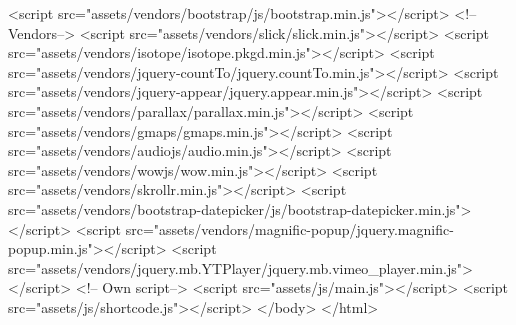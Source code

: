   <script src="assets/vendors/bootstrap/js/bootstrap.min.js"></script> 
  <!-- Vendors--> 
  <script src="assets/vendors/slick/slick.min.js"></script> 
  <script src="assets/vendors/isotope/isotope.pkgd.min.js"></script> 
  <script src="assets/vendors/jquery-countTo/jquery.countTo.min.js"></script> 
  <script src="assets/vendors/jquery-appear/jquery.appear.min.js"></script> 
  <script src="assets/vendors/parallax/parallax.min.js"></script> 
  <script src="assets/vendors/gmaps/gmaps.min.js"></script> 
  <script src="assets/vendors/audiojs/audio.min.js"></script> 
  <script src="assets/vendors/wowjs/wow.min.js"></script> 
  <script src="assets/vendors/skrollr.min.js"></script> 
  <script src="assets/vendors/bootstrap-datepicker/js/bootstrap-datepicker.min.js"></script> 
  <script src="assets/vendors/magnific-popup/jquery.magnific-popup.min.js"></script> 
  <script src="assets/vendors/jquery.mb.YTPlayer/jquery.mb.vimeo_player.min.js"></script> 
  <!-- Own script--> 
  <script src="assets/js/main.js"></script> 
  <script src="assets/js/shortcode.js"></script>   
 </body>
</html>
